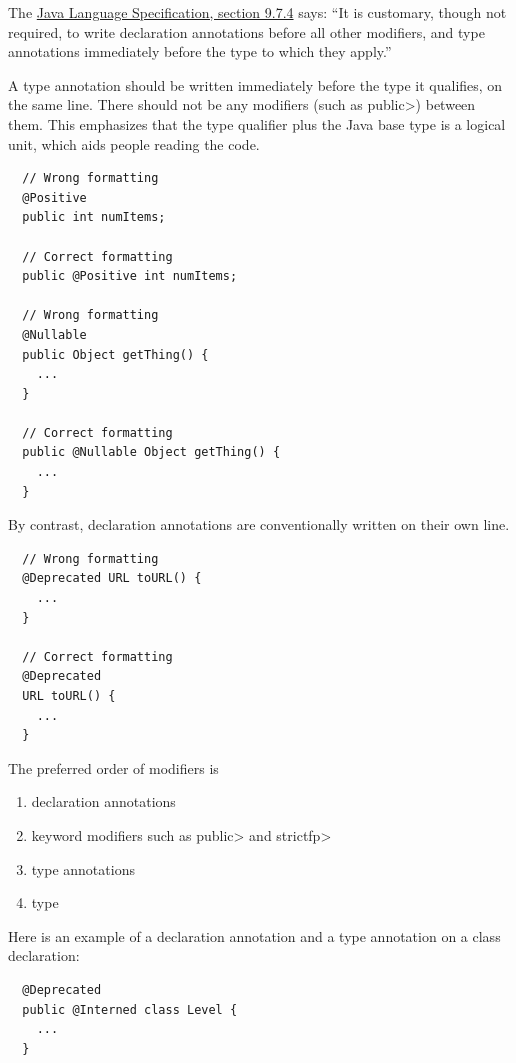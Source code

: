 The
\href{https://docs.oracle.com/javase/specs/jls/se25/html/jls-9.html#jls-9.7.4}{Java
  Language Specification, section 9.7.4} says:  ``It is customary, though
not required, to write declaration annotations before all other modifiers,
and type annotations immediately before the type to which they apply.''

A type annotation should be written immediately before the type it
qualifies, on the same line.  There should not be any modifiers (such as
\<public>) between them.  This emphasizes that the type qualifier plus the
Java base type is a logical unit, which aids people reading the code.

\begin{Verbatim}
  // Wrong formatting
  @Positive
  public int numItems;

  // Correct formatting
  public @Positive int numItems;

  // Wrong formatting
  @Nullable
  public Object getThing() {
    ...
  }

  // Correct formatting
  public @Nullable Object getThing() {
    ...
  }
\end{Verbatim}

By contrast, declaration annotations are conventionally written on their own line.

\begin{Verbatim}
  // Wrong formatting
  @Deprecated URL toURL() {
    ...
  }

  // Correct formatting
  @Deprecated
  URL toURL() {
    ...
  }
\end{Verbatim}

The preferred order of modifiers is
\begin{enumerate}
\item declaration annotations
\item keyword modifiers such as \<public> and \<strictfp>
\item type annotations
\item type
\end{enumerate}

Here is an example of a declaration annotation and a type annotation on a class declaration:

\begin{Verbatim}
  @Deprecated
  public @Interned class Level {
    ...
  }
\end{Verbatim}

%
%
%
%

